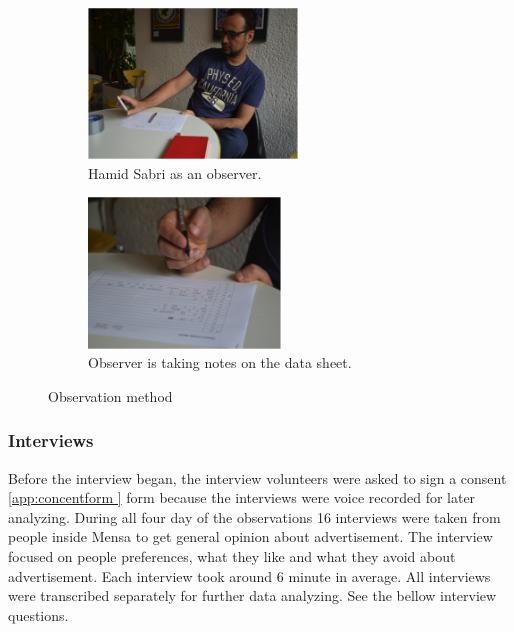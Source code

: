 \begin{figure}[H]
    \centering
    \begin{subfigure}[H]{0.45\textwidth}
        \centering
        \includegraphics[width=\textwidth,height=4cm]{Figures/3/hamid}
        \caption{Hamid Sabri as an observer.}
        \label{fig:hamid}
    \end{subfigure}
    \begin{subfigure}[H]{0.45\textwidth}
        \centering
        \includegraphics[width=\textwidth,height=4cm]{Figures/3/observer}
        \caption{Observer is taking notes on the data sheet.}
        \label{fig:Observer}
    \end{subfigure}
    \caption{Observation method}
    \label{fig:observation_env}
\end{figure}


\subsubsection{Interviews}
Before the interview began, the interview volunteers were asked to sign a consent \ref{app:concentform } form because the interviews were voice recorded for later analyzing.
During all four day of the observations 16 interviews were taken from people inside Mensa to get general opinion about advertisement. The interview focused on people preferences, what they like and what they avoid about advertisement. Each interview took around 6 minute in average. All interviews were transcribed separately for further data analyzing. See the bellow interview questions. 

